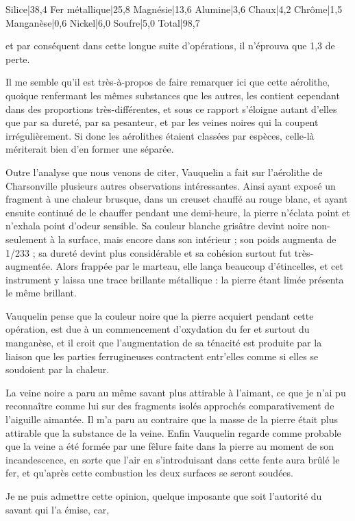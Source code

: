 \documentclass[a4paper, 12pt, oneside, french]{article}
\begin{document}
Silice|38,4  
Fer métallique|25,8  
Magnésie|13,6  
Alumine|3,6  
Chaux|4,2  
Chrôme|1,5  
Manganèse|0,6  
Nickel|6,0  
Soufre|5,0  
Total|98,7

et par conséquent dans cette longue suite d'opérations, il n'éprouva que 1,3 de perte.

Il me semble qu'il est très-à-propos de faire remarquer ici que cette aérolithe, quoique renfermant les mêmes substances que les autres, les contient cependant dans des proportions très-différentes, et sous ce rapport s'éloigne autant d'elles que par sa dureté, par sa pesanteur, et par les veines noires qui la coupent irrégulièrement. Si donc les aérolithes étaient classées par espèces, celle-là mériterait bien d'en former une séparée.

Outre l'analyse que nous venons de citer, Vauquelin a fait sur l'aérolithe de Charsonville plusieurs autres observations intéressantes. Ainsi ayant exposé un fragment à une chaleur brusque, dans un creuset chauffé au rouge blanc, et ayant ensuite continué de le chauffer pendant une demi-heure, la pierre n'éclata point et n'exhala point d'odeur sensible. Sa couleur blanche grisâtre devint noire non-seulement à la surface, mais encore dans son intérieur ; son poids augmenta de 1/233 ; sa dureté devint plus considérable et sa cohésion surtout fut très-augmentée. Alors frappée par le marteau, elle lança beaucoup d'étincelles, et cet instrument y laissa une trace brillante métallique : la pierre étant limée présenta le même brillant.

Vauquelin pense que la couleur noire que la pierre acquiert pendant cette opération, est due à un commencement d'oxydation du fer et surtout du manganèse, et il croit que l'augmentation de sa ténacité est produite par la liaison que les parties ferrugineuses contractent entr'elles comme si elles se soudoient par la chaleur.

La veine noire a paru au même savant plus attirable à l'aimant, ce que je n'ai pu reconnaître comme lui sur des fragments isolés approchés comparativement de l'aiguille aimantée. Il m'a paru au contraire que la masse de la pierre était plus attirable que la substance de la veine. Enfin Vauquelin regarde comme probable que la veine a été formée par une fêlure faite dans la pierre au moment de son incandescence, en sorte que l'air en s'introduisant dans cette fente aura brûlé le fer, et qu'après cette combustion les deux surfaces se seront soudées.

Je ne puis admettre cette opinion, quelque imposante que soit l'autorité du savant qui l'a émise, car,
\end{document}
